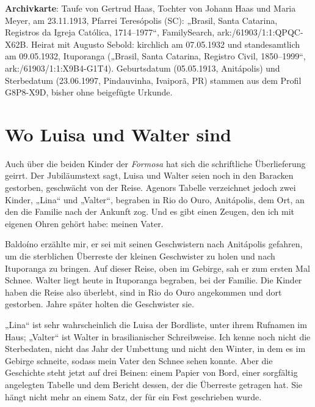\documentclass[
  ngerman,
  11pt,
  openany]{book}
\begin{document}
\begin{ficha}

\textbf{Archivkarte}: Taufe von Gertrud Haas, Tochter von Johann Haas
und Maria Meyer, am 23.11.1913, Pfarrei Teresópolis (SC): „Brasil, Santa
Catarina, Registros da Igreja Católica, 1714--1977``, FamilySearch,
ark:/61903/1:1:QPQC-X62B. Heirat mit Augusto Sebold: kirchlich am
07.05.1932 und standesamtlich am 09.05.1932, Ituporanga („Brasil, Santa
Catarina, Registro Civil, 1850--1999``, ark:/61903/1:1:X9B4-G1T4).
Geburtsdatum (05.05.1913, Anitápolis) und Sterbedatum (23.06.1997,
Pindauvinha, Ivaiporã, PR) stammen aus dem Profil G8P8-X9D, bisher ohne
beigefügte Urkunde.

\end{ficha}

\section{Wo Luisa und Walter sind}\label{wo-luisa-und-walter-sind}

Auch über die beiden Kinder der \emph{Formosa} hat sich die schriftliche
Überlieferung geirrt. Der Jubiläumstext sagt, Luisa und Walter seien
noch in den Baracken gestorben, geschwächt von der Reise. Agenors
Tabelle verzeichnet jedoch zwei Kinder, „Lina`` und „Valter``, begraben
in Rio do Ouro, Anitápolis, dem Ort, an den die Familie nach der Ankunft
zog. Und es gibt einen Zeugen, den ich mit eigenen Ohren gehört habe:
meinen Vater.

Baldoíno erzählte mir, er sei mit seinen Geschwistern nach Anitápolis
gefahren, um die sterblichen Überreste der kleinen Geschwister zu holen
und nach Ituporanga zu bringen. Auf dieser Reise, oben im Gebirge, sah
er zum ersten Mal Schnee. Walter liegt heute in Ituporanga begraben, bei
der Familie. Die Kinder haben die Reise also überlebt, sind in Rio do
Ouro angekommen und dort gestorben. Jahre später holten die Geschwister
sie.

„Lina`` ist sehr wahrscheinlich die Luisa der Bordliste, unter ihrem
Rufnamen im Haus; „Valter`` ist Walter in brasilianischer Schreibweise.
Ich kenne noch nicht die Sterbedaten, nicht das Jahr der Umbettung und
nicht den Winter, in dem es im Gebirge schneite, sodass mein Vater den
Schnee sehen konnte. Aber die Geschichte steht jetzt auf drei Beinen:
einem Papier von Bord, einer sorgfältig angelegten Tabelle und dem
Bericht dessen, der die Überreste getragen hat. Sie hängt nicht mehr an
einem Satz, der für ein Fest geschrieben wurde.
\end{document}
